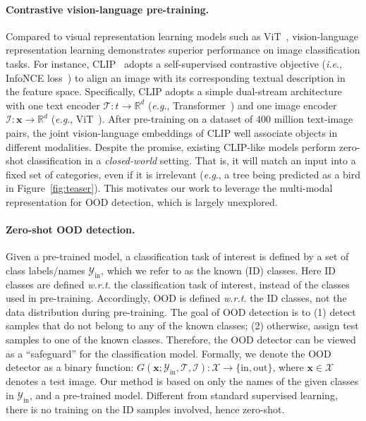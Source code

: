 \documentclass{article}
\def\*#1{\mathbf{#1}}
\def\ie{\emph{i.e}., }
\def\eg{\emph{e.g}., }
\begin{document}
\paragraph{Contrastive vision-language pre-training.}
Compared to visual representation learning models such as ViT~\cite{dosovitskiy2021an}, vision-language representation learning demonstrates superior performance on image classification tasks. For instance, CLIP~\cite{radford2021learning} adopts a self-supervised contrastive objective (\ie InfoNCE loss~\cite{van2018representation}) to align an image with its corresponding textual description in the feature space. 
Specifically, CLIP adopts a simple dual-stream architecture with one text encoder $\mathcal{T}: t \rightarrow \mathbb{R}^d$ (\eg Transformer~\cite{vaswani2017attention}) and one image encoder $\mathcal{I}: \*x \rightarrow \mathbb{R}^d$ (\eg ViT~\cite{dosovitskiy2021an}). After pre-training on a dataset of 400 million text-image pairs, the joint vision-language embeddings of CLIP well associate objects in different modalities. Despite the promise, existing CLIP-like models perform zero-shot classification in a \emph{closed-world} setting. That is, it will match an input into a fixed set of categories, even if it is irrelevant (\eg  a tree being predicted as a bird in Figure~\ref{fig:teaser}). This motivates our work to leverage the multi-modal representation for OOD detection, which is largely unexplored.

\paragraph{Zero-shot OOD detection.} 
Given a pre-trained model, a classification task of interest is defined by a set of
class labels/names $\mathcal{Y}_\text{in}$, which we refer to as the known (ID) classes. Here ID classes are defined \emph{w.r.t.} the classification task of interest, instead of the classes used in pre-training.
Accordingly, OOD is defined \emph{w.r.t.} the ID classes, not the data distribution during pre-training. The goal of OOD detection
is to (1) detect samples that do not belong to any of the
known classes; (2) otherwise, assign test samples to one of the known
classes. Therefore, the OOD detector can be viewed as a ``safeguard'' for the classification model. Formally, we denote the OOD detector as a binary function: $G(\*x;\mathcal{Y}_\text{in}, \mathcal{T}, \mathcal{I}): \mathcal{X} \rightarrow \{\text{in}, \text{out}\}$,
where $\*x \in \mathcal{X}$ denotes a test image. 
Our method is based on only the names of the
given classes in $\mathcal{Y}_\text{in}$, and a pre-trained model. Different from standard supervised learning, there is no training on the ID samples involved, hence zero-shot.
\end{document}
